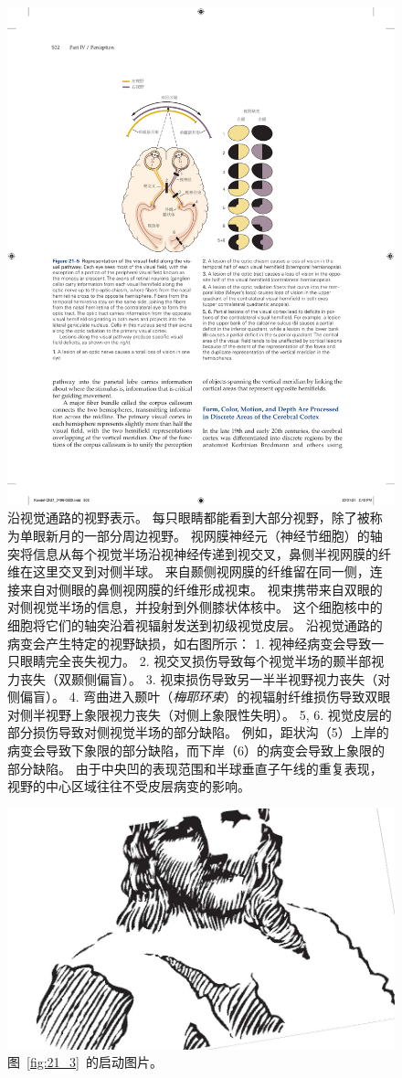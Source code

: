 \begin{figure}[htbp]
	\centering
	\includegraphics[width=0.65\linewidth]{chap21/fig_21_5}
	\caption{沿视觉通路的视野表示。
		每只眼睛都能看到大部分视野，除了被称为单眼新月的一部分周边视野。
		视网膜神经元（神经节细胞）的轴突将信息从每个视觉半场沿视神经传递到视交叉，鼻侧半视网膜的纤维在这里交叉到对侧半球。
		来自颞侧视网膜的纤维留在同一侧，连接来自对侧眼的鼻侧视网膜的纤维形成视束。
		视束携带来自双眼的对侧视觉半场的信息，并投射到外侧膝状体核中。
		这个细胞核中的细胞将它们的轴突沿着视辐射发送到初级视觉皮层。
		沿视觉通路的病变会产生特定的视野缺损，如右图所示：
		1. 视神经病变会导致一只眼睛完全丧失视力。
		2. 视交叉损伤导致每个视觉半场的颞半部视力丧失（双颞侧偏盲）。
		3. 视束损伤导致另一半半视野视力丧失（对侧偏盲）。
		4. 弯曲进入颞叶（\textit{梅耶环束}）的视辐射纤维损伤导致双眼对侧半视野上象限视力丧失（对侧上象限性失明）。
		5, 6. 视觉皮层的部分损伤导致对侧视觉半场的部分缺陷。
		例如，距状沟（5）上岸的病变会导致下象限的部分缺陷，而下岸（6）的病变会导致上象限的部分缺陷。 由于中央凹的表现范围和半球垂直子午线的重复表现，视野的中心区域往往不受皮层病变的影响。}
	\label{fig:21_5}
\end{figure}


\begin{figure}[htbp]
	\centering
	\includegraphics[width=0.7\linewidth]{chap21/fig_21_3_1}
	\caption{图~\ref{fig:21_3}~的启动图片。}
	\label{fig:21_3_1}
\end{figure}


